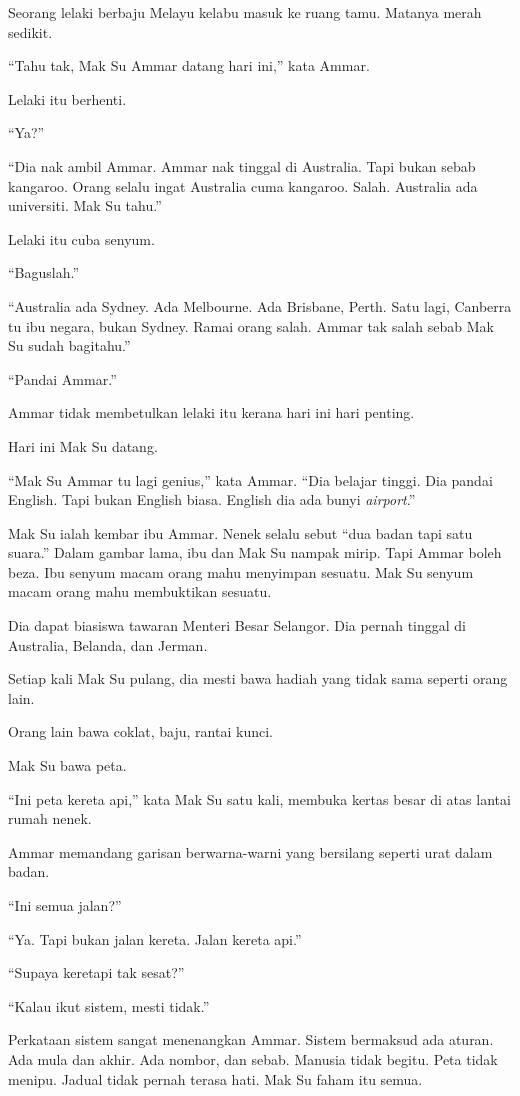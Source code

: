 \documentclass[
  11pt,
  a5paper,
  openany,
  oneside]{book}
\begin{document}
Seorang lelaki berbaju Melayu kelabu masuk ke ruang tamu. Matanya merah
sedikit.

``Tahu tak, Mak Su Ammar datang hari ini,'' kata Ammar.

Lelaki itu berhenti.

``Ya?''

``Dia nak ambil Ammar. Ammar nak tinggal di Australia. Tapi bukan sebab
kangaroo. Orang selalu ingat Australia cuma kangaroo. Salah. Australia
ada universiti. Mak Su tahu.''

Lelaki itu cuba senyum.

``Baguslah.''

``Australia ada Sydney. Ada Melbourne. Ada Brisbane, Perth. Satu lagi,
Canberra tu ibu negara, bukan Sydney. Ramai orang salah. Ammar tak salah
sebab Mak Su sudah bagitahu.''

``Pandai Ammar.''

Ammar tidak membetulkan lelaki itu kerana hari ini hari penting.

Hari ini Mak Su datang.

``Mak Su Ammar tu lagi genius,'' kata Ammar. ``Dia belajar tinggi. Dia
pandai English. Tapi bukan English biasa. English dia ada bunyi
\emph{airport}.''

Mak Su ialah kembar ibu Ammar. Nenek selalu sebut ``dua badan tapi satu
suara.'' Dalam gambar lama, ibu dan Mak Su nampak mirip. Tapi Ammar
boleh beza. Ibu senyum macam orang mahu menyimpan sesuatu. Mak Su senyum
macam orang mahu membuktikan sesuatu.

Dia dapat biasiswa tawaran Menteri Besar Selangor. Dia pernah tinggal di
Australia, Belanda, dan Jerman.

Setiap kali Mak Su pulang, dia mesti bawa hadiah yang tidak sama seperti
orang lain.

Orang lain bawa coklat, baju, rantai kunci.

Mak Su bawa peta.

``Ini peta kereta api,'' kata Mak Su satu kali, membuka kertas besar di
atas lantai rumah nenek.

Ammar memandang garisan berwarna-warni yang bersilang seperti urat dalam
badan.

``Ini semua jalan?''

``Ya. Tapi bukan jalan kereta. Jalan kereta api.''

``Supaya keretapi tak sesat?''

``Kalau ikut sistem, mesti tidak.''

Perkataan sistem sangat menenangkan Ammar. Sistem bermaksud ada aturan.
Ada mula dan akhir. Ada nombor, dan sebab. Manusia tidak begitu. Peta
tidak menipu. Jadual tidak pernah terasa hati. Mak Su faham itu semua.
\end{document}
